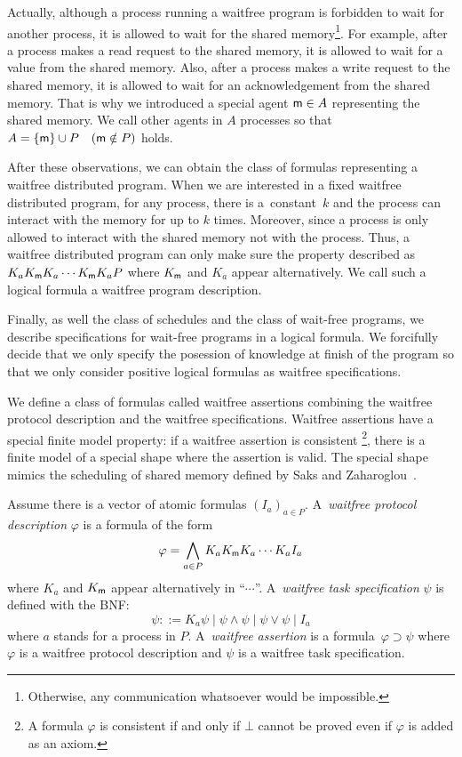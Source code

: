 Actually, although a process running a waitfree program is forbidden to wait for another process,
it is allowed to wait for the shared memory\footnote{Otherwise, any communication
whatsoever would be impossible.}.
For example, after a process
 makes a read request to the shared memory,
 it is allowed to wait for a value from the shared memory.
 Also, after a process makes a write request to the shared memory,
 it is allowed to wait for an acknowledgement from the shared memory.
 That is why we introduced a special agent ${\sf m}\in A$ representing the shared memory.
 We call other agents in $A$ processes so that
 $A=\{{\sf m}\}\cup P\quad ({\sf m}\notin P)$ holds.

 After these observations, we can obtain the class of
 formulas representing a waitfree distributed program.
 When we are interested in a fixed waitfree distributed program,
 for any process, there is a~constant~$k$ and the process can interact with the memory for
 up to $k$ times.
 Moreover, since a process is only allowed to interact with the shared memory not with the
 process.
 Thus, a waitfree distributed program can only make sure the property described as 
 $K_aK_{\sf m} K_a\cdots K_{\sf m} K_a P$ where $K_{\sf m}$ and $K_a$ appear
 alternatively.
 We call such a logical formula a waitfree program description.

 Finally, as well the class of schedules and the class of wait-free programs,
 we describe specifications for wait-free programs in a logical formula.
 We forcifully decide that we only specify the posession of knowledge at finish of the
 program so that we only consider positive logical formulas as waitfree specifications.

We define a class of formulas called waitfree assertions combining the waitfree protocol
description and the waitfree specifications.
Waitfree assertions have a special finite model property:
if a waitfree assertion is consistent%
\footnote{A formula $\varphi$ is consistent if and only if $\bot$ cannot be proved even if
$\varphi$ is added as an axiom.}, there is a finite model of a special shape
where the assertion is valid.
The special shape mimics the scheduling of shared memory
defined by Saks and Zaharoglou~\cite{saks2000wait}.

\begin{definition}
 Assume there is a vector of atomic formulas $(I_a)_{a\in P}$.
 A~\textit{waitfree protocol description} $\varphi$ is a formula of the form
\[
 \varphi = \bigwedge_{a\in P} K_a K_{\sf m} K_a \cdots K_a I_a
\]
where $K_a$ and $K_{\sf m}$ appear alternatively in ``$\cdots$''.
 A~\textit{waitfree task specification} $\psi$ is defined with the BNF:
\[
 \psi ::= K_a\psi\mid \psi\wedge\psi\mid \psi\vee\psi\mid I_a
\]
where $a$ stands for a process in $P$.
 A~\textit{waitfree assertion} is a formula~$\varphi\supset\psi$ where $\varphi$ is a
 waitfree protocol description and $\psi$ is a waitfree task specification.
\end{definition}

